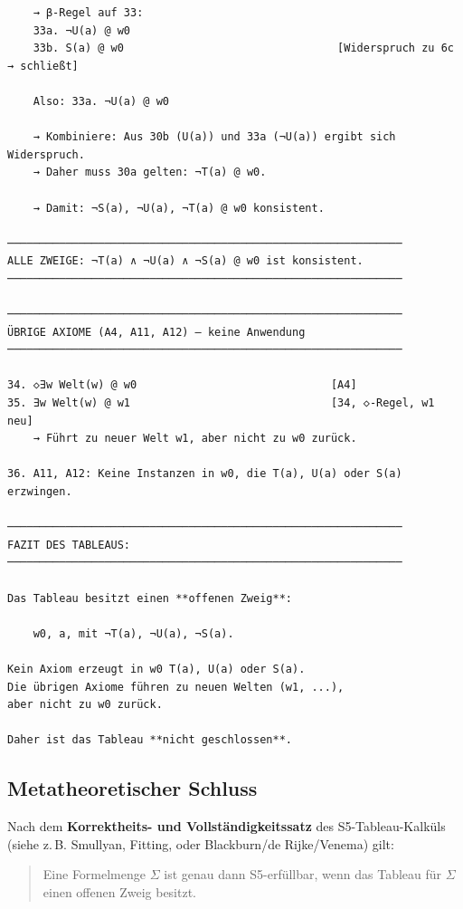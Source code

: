 \documentclass[
]{article}
\begin{document}
\begin{verbatim}
    → β-Regel auf 33:
    33a. ¬U(a) @ w0
    33b. S(a) @ w0                                 [Widerspruch zu 6c → schließt]

    Also: 33a. ¬U(a) @ w0

    → Kombiniere: Aus 30b (U(a)) und 33a (¬U(a)) ergibt sich Widerspruch.
    → Daher muss 30a gelten: ¬T(a) @ w0.

    → Damit: ¬S(a), ¬U(a), ¬T(a) @ w0 konsistent.

─────────────────────────────────────────────────────────────
ALLE ZWEIGE: ¬T(a) ∧ ¬U(a) ∧ ¬S(a) @ w0 ist konsistent.
─────────────────────────────────────────────────────────────

─────────────────────────────────────────────────────────────
ÜBRIGE AXIOME (A4, A11, A12) – keine Anwendung
─────────────────────────────────────────────────────────────

34. ◇∃w Welt(w) @ w0                              [A4]
35. ∃w Welt(w) @ w1                               [34, ◇-Regel, w1 neu]
    → Führt zu neuer Welt w1, aber nicht zu w0 zurück.

36. A11, A12: Keine Instanzen in w0, die T(a), U(a) oder S(a) erzwingen.

─────────────────────────────────────────────────────────────
FAZIT DES TABLEAUS:
─────────────────────────────────────────────────────────────

Das Tableau besitzt einen **offenen Zweig**:

    w0, a, mit ¬T(a), ¬U(a), ¬S(a).

Kein Axiom erzeugt in w0 T(a), U(a) oder S(a).
Die übrigen Axiome führen zu neuen Welten (w1, ...),
aber nicht zu w0 zurück.

Daher ist das Tableau **nicht geschlossen**.
\end{verbatim}

\subsection{Metatheoretischer Schluss}

Nach dem \textbf{Korrektheits- und Vollständigkeitssatz} des S5-Tableau-Kalküls
(siehe z.\,B. Smullyan, Fitting, oder Blackburn/de Rijke/Venema) gilt:

\begin{quote}
Eine Formelmenge \(\Sigma\) ist genau dann S5-erfüllbar, wenn das Tableau für \(\Sigma\) einen offenen Zweig besitzt.
\end{quote}
\end{document}
